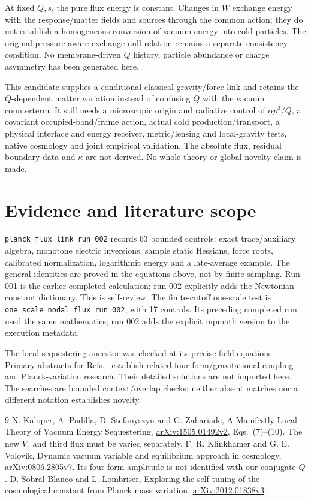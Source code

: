 \documentclass[11pt]{article}
\begin{document}
At fixed $Q,s$, the pure flux energy is constant. Changes in $W$ exchange
energy with the response/matter fields and sources through the common
action; they do not establish a homogeneous conversion of vacuum energy
into cold particles. The original pressure-aware exchange null relation
remains a separate consistency condition. No membrane-driven $Q$ history,
particle abundance or charge asymmetry has been generated here.

This candidate supplies a conditional classical gravity/force link and
retains the $Q$-dependent matter variation instead of confusing $Q$ with
the vacuum counterterm. It still needs a microscopic origin and radiative
control of $\alpha p^3/Q$, a covariant occupied-band/frame action, actual
cold production/transport, a physical interface and energy receiver,
metric/lensing and local-gravity tests, native cosmology and joint
empirical validation. The absolute flux, residual boundary data and
$\kappa$ are not derived. No whole-theory or global-novelty claim is made.

\section{Evidence and literature scope}
\texttt{planck\_flux\_link\_run\_002} records 63 bounded controls:
exact trace/auxiliary algebra, monotone electric inversions, sample static
Hessians, force roots, calibrated normalization, logarithmic energy and a
late-average example. The general identities are proved in the equations
above, not by finite sampling. Run 001 is the earlier completed calculation;
run 002 explicitly adds the Newtonian constant dictionary. This is self-review.
The finite-cutoff one-scale test is
\texttt{one\_scale\_nodal\_flux\_run\_002}, with 17 controls.
Its preceding completed run used the same mathematics; run 002 adds the
explicit mpmath version to the execution metadata.

The local sequestering ancestor was checked at its precise field equations.
Primary abstracts for Refs.~\cite{pf:qtheory,pf:planck} establish related
four-form/gravitational-coupling and Planck-variation research. Their detailed
solutions are not imported here. The searches are bounded context/overlap
checks; neither absent matches nor a different notation establishes novelty.

\begin{thebibliography}{9}
 N. Kaloper, A. Padilla, D. Stefanyszyn and
G. Zahariade, A Manifestly Local Theory of Vacuum Energy Sequestering,
\href{https://arxiv.org/pdf/1505.01492v2}{arXiv:1505.01492v2},
Eqs.~(7)--(10). The new $V_r$ and third flux must be varied separately.
 F. R. Klinkhamer and G. E. Volovik,
Dynamic vacuum variable and equilibrium approach in cosmology,
\href{https://arxiv.org/abs/0806.2805v7}{arXiv:0806.2805v7}.
Its four-form amplitude is not identified with our conjugate $Q$.
 D. Sobral-Blanco and L. Lombriser,
Exploring the self-tuning of the cosmological constant from Planck mass
variation, \href{https://arxiv.org/abs/2012.01838v3}{arXiv:2012.01838v3}.
\end{thebibliography}
\end{document}
